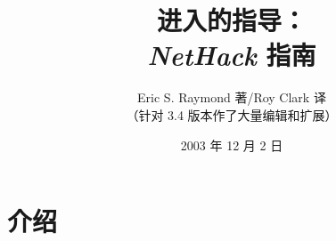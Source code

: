 \documentclass[a4paper, 10pt]{article}
\begin{document}
%
%

\title{\LARGE 进入\zhTransMazesOfMenace{}的指导：\\
\Large {\it NetHack\/} 指南}

\author{Eric S. Raymond 著/Roy Clark 译\\
（针对 3.4 版本作了大量编辑和扩展）}
\date{2003 年 12 月 2 日}

\maketitle

\section{介绍}

\end{document}
